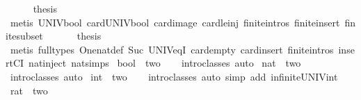\begin{isabellebody}
\ \ \ \ \isamarkupfalse%
\ {\isacharquery}thesis\isanewline
\ \ \ \ \ \ \isamarkupfalse%
\ {\isacharparenleft}metis\ UNIV{\isacharunderscore}bool\ card{\isacharunderscore}UNIV{\isacharunderscore}bool\ card{\isacharunderscore}image\ card{\isacharunderscore}le{\isacharunderscore}inj\ finite{\isachardot}intros{\isacharparenleft}{}{\isacharparenright}\ finite{\isacharunderscore}insert\ finite{\isacharunderscore}subset{\isacharparenright}\isanewline
\ \ \isamarkupfalse%
\isanewline
\ \ \isamarkupfalse%
\ {\isacharquery}thesis\isanewline
\ \ \ \ \isamarkupfalse%
\ {\isacharparenleft}metis\ {\isacharparenleft}full{\isacharunderscore}types{\isacharparenright}\ One{\isacharunderscore}nat{\isacharunderscore}def\ Suc{\isacharunderscore}{}\ UNIV{\isacharunderscore}eq{\isacharunderscore}I\ card{\isachardot}empty\ card{\isachardot}insert\ finite{\isachardot}intros{\isacharparenleft}{}{\isacharparenright}\ insertCI\ nat{\isachardot}inject\ nat{\isachardot}simps{\isacharparenleft}{}{\isacharparenright}{\isacharparenright}\isanewline
{}\isamarkupfalse%
%
\endisatagproof
{\isafoldproof}%
%
\isadelimproof
\isanewline
%
\endisadelimproof
\isanewline
{}\isamarkupfalse%
\isanewline
\isanewline
{}\isamarkupfalse%
\ bool\ {\isacharcolon}{\isacharcolon}\ two\isanewline
%
\isadelimproof
\ \ %
\endisadelimproof
%
\isatagproof
{}\isamarkupfalse%
\ {\isacharparenleft}intro{\isacharunderscore}classes{\isacharcomma}\ auto{\isacharparenright}%
\endisatagproof
{\isafoldproof}%
%
\isadelimproof
\isanewline
%
\endisadelimproof
\isanewline
{}\isamarkupfalse%
\ nat\ {\isacharcolon}{\isacharcolon}\ two\isanewline
%
\isadelimproof
\ \ %
\endisadelimproof
%
\isatagproof
{}\isamarkupfalse%
\ {\isacharparenleft}intro{\isacharunderscore}classes{\isacharcomma}\ auto{\isacharparenright}%
\endisatagproof
{\isafoldproof}%
%
\isadelimproof
\isanewline
%
\endisadelimproof
\isanewline
{}\isamarkupfalse%
\ int\ {\isacharcolon}{\isacharcolon}\ two\isanewline
%
\isadelimproof
\ \ %
\endisadelimproof
%
\isatagproof
{}\isamarkupfalse%
\ {\isacharparenleft}intro{\isacharunderscore}classes{\isacharcomma}\ auto\ simp\ add{\isacharcolon}\ infinite{\isacharunderscore}UNIV{\isacharunderscore}int{\isacharparenright}%
\endisatagproof
{\isafoldproof}%
%
\isadelimproof
\isanewline
%
\endisadelimproof
\isanewline
{}\isamarkupfalse%
\ rat\ {\isacharcolon}{\isacharcolon}\ two\isanewline

\end{isabellebody}
